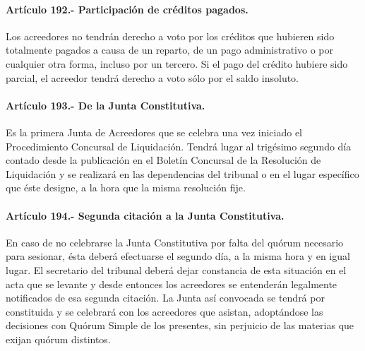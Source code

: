 \documentclass[
]{book}
\begin{document}
\hypertarget{artuxedculo-192.--participaciuxf3n-de-cruxe9ditos-pagados.}{%
\paragraph*{Artículo 192.- Participación de créditos pagados.}\label{artuxedculo-192.--participaciuxf3n-de-cruxe9ditos-pagados.}}

Los acreedores no tendrán derecho a voto por los créditos que hubieren sido totalmente pagados a causa de un reparto, de un pago administrativo o por cualquier otra forma, incluso por un tercero. Si el pago del crédito hubiere sido parcial, el acreedor tendrá derecho a voto sólo por el saldo insoluto.

\hypertarget{artuxedculo-193.--de-la-junta-constitutiva.}{%
\paragraph*{Artículo 193.- De la Junta Constitutiva.}\label{artuxedculo-193.--de-la-junta-constitutiva.}}

Es la primera Junta de Acreedores que se celebra una vez iniciado el Procedimiento Concursal de Liquidación. Tendrá lugar al trigésimo segundo día contado desde la publicación en el Boletín Concursal de la Resolución de Liquidación y se realizará en las dependencias del tribunal o en el lugar específico que éste designe, a la hora que la misma resolución fije.

\hypertarget{artuxedculo-194.--segunda-citaciuxf3n-a-la-junta-constitutiva.}{%
\paragraph*{Artículo 194.- Segunda citación a la Junta Constitutiva.}\label{artuxedculo-194.--segunda-citaciuxf3n-a-la-junta-constitutiva.}}

En caso de no celebrarse la Junta Constitutiva por falta del quórum necesario para sesionar, ésta deberá efectuarse el segundo día, a la misma hora y en igual lugar. El secretario del tribunal deberá dejar constancia de esta situación en el acta que se levante y desde entonces los acreedores se entenderán legalmente notificados de esa segunda citación. La Junta así convocada se tendrá por constituida y se celebrará con los acreedores que asistan, adoptándose las decisiones con Quórum Simple de los presentes, sin perjuicio de las materias que exijan quórum distintos.
\end{document}
